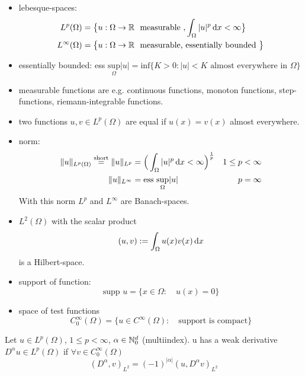 	\begin{itemize}
		\item lebesque-spaces: 
		\begin{align*}
		L^p(\Omega) &= \big\{ u: \Omega \to \mathbb{R} \ \text{ measurable } , \int_\Omega |u|^p \mathop{}\!\mathrm{d} x < \infty \big\}  \\
		L^\infty(\Omega) &= \big\{ u: \Omega \to \mathbb{R} \ \text{ measurable, essentially bounded } \big\}
		\end{align*}
		\item essentially bounded: ess $ \underset{\Omega}{\text{sup}} |u| = \text{inf}\big\{ K >0 : |u|<K \text{ almost everywhere in } \Omega \big\}  $
		
		\item measurable functions are e.g. continuous functions, monoton functions, step-functions, riemann-integrable functions.
		\item two functions $u,v \in L^p(\Omega)$ are equal if $u(x) = v(x)$ almost everywhere.
		\item norm: 
		\begin{align*}
		\|u\|_{L^p(\Omega)} \overset{\text{short}}{=}\|u\|_{L^p} &= \Big ( \int_\Omega |u|^p \mathop{}\!\mathrm{d} x < \infty \Big )^{\frac{1}{p} } & 1 \leq p&<\infty \\
		\|u\|_{L^\infty} &= \text{ess }\underset{\Omega}{\text{sup}} |u| & p&= \infty 
		\end{align*}
		With this norm $L^p$ and $L^\infty$ are Banach-spaces.
		\item $L^2(\Omega)$ with the scalar product
		\begin{equation*}
		(u,v) := \int_\Omega u(x)v(x) \mathop{}\!\mathrm{d} x 
		\end{equation*}
		is a Hilbert-space.
		\item support of function:
		\begin{equation*}
		\text{supp }u  = \big \{ x \in \Omega:\quad u(x)=0  \big \} 
		\end{equation*}
		\item space of test functions
		\begin{equation*}
		C^\infty_0(\Omega) = \big \{ u \in C^\infty(\Omega):\quad \text{support is compact}  \big\}
		\end{equation*}
	\end{itemize}



Let $ u \in L^p(\Omega)$, $1 \leq p< \infty$, $\alpha \in \mathbb{N}^d_0$ (multiindex).\enter
u has a weak derivative $ D^\alpha u \in L^p(\Omega) $ if $\forall v \in C^\infty_0(\Omega)$
\begin{equation*}
	(D^\alpha,v)_{L^2} = (-1)^{|\alpha|} (u,D^\alpha v)_{L^2}
\end{equation*}

